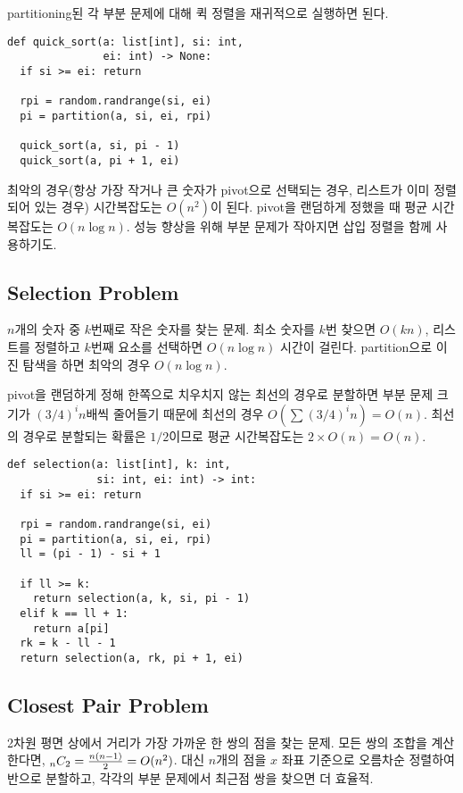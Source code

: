 partitioning된 각 부분 문제에 대해 퀵 정렬을 재귀적으로 실행하면 된다.

\begin{verbatim}
def quick_sort(a: list[int], si: int,
               ei: int) -> None:
  if si >= ei: return

  rpi = random.randrange(si, ei)
  pi = partition(a, si, ei, rpi)

  quick_sort(a, si, pi - 1)
  quick_sort(a, pi + 1, ei)
\end{verbatim}

최악의 경우(항상 가장 작거나 큰 숫자가 pivot으로 선택되는 경우, 리스트가 이미 정렬되어 있는 경우) 시간복잡도는 $O(n^2)$이 된다. pivot을 랜덤하게 정했을 때 평균 시간복잡도는 $O(n \log{n})$. 성능 향상을 위해 부분 문제가 작아지면 삽입 정렬을 함께 사용하기도.

\subsection{Selection Problem}

$n$개의 숫자 중 $k$번째로 작은 숫자를 찾는 문제. 최소 숫자를 $k$번 찾으면 $O(kn)$, 리스트를 정렬하고 $k$번째 요소를 선택하면 $O(n \log{n})$ 시간이 걸린다. partition으로 이진 탐색을 하면 최악의 경우 $O(n \log{n})$.

pivot을 랜덤하게 정해 한쪽으로 치우치지 않는 최선의 경우로 분할하면 부분 문제 크기가 $(3/ 4)^in$배씩 줄어들기 때문에 최선의 경우 $O(\sum{(3 / 4)^in}) = O(n)$. 최선의 경우로 분할되는 확률은 $1 / 2$이므로 평균 시간복잡도는 $2 \times O(n) = O(n)$.

\begin{verbatim}
def selection(a: list[int], k: int,
              si: int, ei: int) -> int:
  if si >= ei: return

  rpi = random.randrange(si, ei)
  pi = partition(a, si, ei, rpi)
  ll = (pi - 1) - si + 1

  if ll >= k:
    return selection(a, k, si, pi - 1)
  elif k == ll + 1:
    return a[pi]
  rk = k - ll - 1
  return selection(a, rk, pi + 1, ei)
\end{verbatim}

\subsection{Closest Pair Problem}

2차원 평면 상에서 거리가 가장 가까운 한 쌍의 점을 찾는 문제. 모든 쌍의 조합을 계산한다면, ${}_{n}C_{2} = {n(n - 1) \over 2} = O(n^2)$. 대신 $n$개의 점을 $x$ 좌표 기준으로 오름차순 정렬하여 반으로 분할하고, 각각의 부분 문제에서 최근점 쌍을 찾으면 더 효율적.

